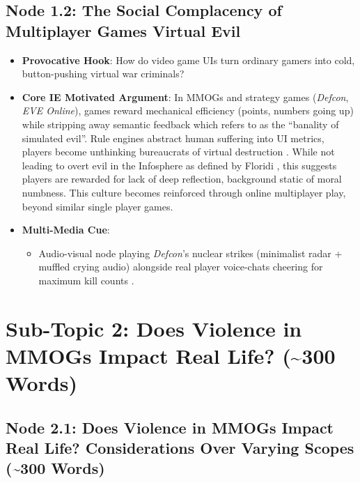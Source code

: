 \documentclass[
  a4paper,
  10pt]{article}
\providecommand{\tightlist}{%
  \setlength{\itemsep}{0pt}\setlength{\parskip}{0pt}}
\begin{document}
\subsection{Node 1.2: The Social Complacency of Multiplayer Games
Virtual
Evil}\label{node-1.2-the-social-complacency-of-multiplayer-games-virtual-evil}

\begin{itemize}
\item
  \textbf{Provocative Hook}: How do video game UIs turn ordinary gamers
  into cold, button-pushing virtual war criminals?
\item
  \textbf{Core IE Motivated Argument}: In MMOGs and strategy games
  (\emph{Defcon}, \emph{EVE Online}), games reward mechanical efficiency
  (points, numbers going up) while stripping away semantic feedback
  which
  \autocite{sicartHowLearnedLove2008a,sicartBanalitySimulatedEvil2009a}
  refers to as the ``banality of simulated evil''. Rule engines abstract
  human suffering into UI metrics, players become unthinking bureaucrats
  of virtual destruction \autocite{sicartBanalitySimulatedEvil2009a}.
  While not leading to overt evil in the Infosphere as defined by
  Floridi \autocite{himmaHandbookInformationComputer2008}, this suggests
  players are rewarded for lack of deep reflection, background static of
  moral numbness. This culture becomes reinforced through online
  multiplayer play, beyond similar single player games.
\item
  \textbf{Multi-Media Cue}:

  \begin{itemize}
  \tightlist
  \item
    Audio-visual node playing \emph{Defcon}'s nuclear strikes
    (minimalist radar + muffled crying audio) alongside real player
    voice-chats cheering for maximum kill counts
    \autocite{sicartHowLearnedLove2008a}.
  \end{itemize}
\end{itemize}

\section{Sub-Topic 2: Does Violence in MMOGs Impact Real Life?
(\textasciitilde300
Words)}\label{sub-topic-2-does-violence-in-mmogs-impact-real-life-300-words}

\subsection{Node 2.1: Does Violence in MMOGs Impact Real Life?
Considerations Over Varying Scopes (\textasciitilde300
Words)}\label{node-2.1-does-violence-in-mmogs-impact-real-life-considerations-over-varying-scopes-300-words}
\end{document}
